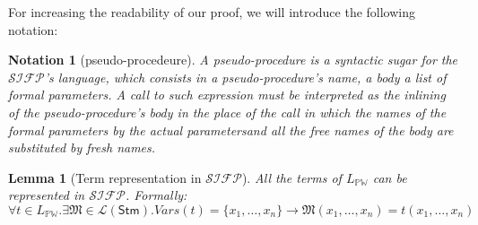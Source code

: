 \documentclass[10pt]{amsart}
\newcommand{\Wl}{\mathbb{PW}}
\newcommand{\SIFP}{\mathcal{SIFP}}
\newcommand{\vone}{x}
\newcommand{\lang}[1]{\mathcal L(#1)}
\newcommand{\stm}{\mathsf{Stm}}
\newcommand{\MM}{\mathfrak M}
\newtheorem{lemma}{Lemma}
\newtheorem{notation}{Notation}
\begin{document}
For increasing the readability of our proof, we will introduce the following notation:

\begin{notation}[pseudo-procedeure]
A pseudo-procedure is a syntactic sugar for the $\SIFP$'s language, which consists in a \emph{pseudo-procedure's name}, a \emph{body} a list of \emph{formal parameters}. A call to such expression must be interpreted as the inlining of the pseudo-procedure's body in the place of the call in which the names of the formal parameters by the actual parametersand all the \emph{free} names of the body are substituted by fresh names.
\end{notation}


\begin{lemma}[Term representation in $\SIFP$]
All the terms of $L_\Wl$ can be represented in $\SIFP$. Formally: $\forall t \in L_\Wl. \exists \MM\in \lang{\stm}. Vars(t)=\{\vone_1, \ldots, \vone_n\} \to \MM(\vone_1, \ldots, \vone_n)= t(\vone_1, \ldots, \vone_n)$
\end{lemma}
\end{document}

